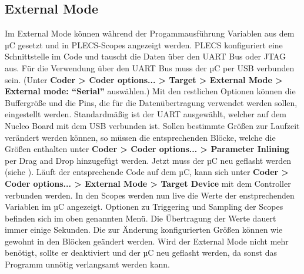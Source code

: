 \documentclass[a4paper,11pt,oneside]{article}
\begin{document}
\subsection*{External Mode}
Im External Mode können während der Progammausführung Variablen aus dem µC gesetzt und in PLECS-Scopes angezeigt werden. PLECS konfiguriert eine Schnittstelle im Code und tauscht die Daten über den UART Bus oder JTAG aus. Für die Verwendung über den UART Bus muss der µC per USB verbunden sein. (Unter \textbf{Coder > Coder options... > Target > External Mode > External mode: \enquote{Serial}} auswählen.) Mit den restlichen Optionen können die Buffergröße und die Pins, die für die Datenübertragung verwendet werden sollen, eingestellt werden. Standardmäßig ist der UART ausgewählt, welcher auf dem Nucleo Board mit dem USB verbunden ist. Sollen bestimmte Größen zur Laufzeit verändert werden können, so müssen die entsprechenden Blöcke, welche die Größen enthalten unter \textbf{Coder > Coder options... > Parameter Inlining} per Drag and Drop hinzugefügt werden. Jetzt muss der µC neu geflasht werden (siehe ). Läuft der entsprechende Code auf dem µC, kann sich unter \textbf{Coder > Coder options... > External Mode > Target Device} mit dem Controller verbunden werden. In den Scopes werden nun live die Werte der enstprechenden Variablen im µC angezeigt. Optionen zu Triggering und Sampling der Scopes befinden sich im oben genannten Menü. Die Übertragung der Werte dauert immer einige Sekunden. Die zur Änderung konfigurierten Größen können wie gewohnt in den Blöcken geändert werden.
Wird der External Mode nicht mehr benötigt, sollte er deaktiviert und der µC neu geflasht werden, da sonst das Programm unnötig verlangsamt werden kann.
\end{document}
